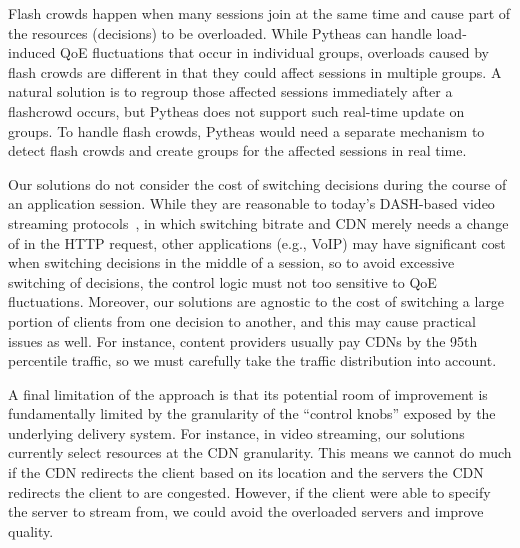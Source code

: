 Flash crowds happen when many sessions join at the same 
time and cause part of the resources (decisions) to be overloaded.
While Pytheas can handle load-induced QoE fluctuations that occur 
in individual groups, overloads caused by flash crowds are different in 
that they could affect sessions in multiple groups. A natural solution is 
to regroup those affected sessions immediately after a flashcrowd occurs, 
but Pytheas does not support such real-time update on groups. 
To handle flash crowds, Pytheas would need a separate mechanism to 
detect flash crowds and create groups for the affected sessions in 
real time.



Our solutions do not consider the cost of switching decisions during the course 
of an application session. 
While they are reasonable to today's DASH-based video streaming 
protocols~\cite{dash-standard}, in which switching bitrate and CDN merely needs
a change of in the HTTP request, other applications (e.g., VoIP) 
may have significant cost when switching decisions in the middle of a 
session, so to avoid excessive switching of decisions, the control logic must not 
too sensitive to QoE fluctuations.
Moreover, our solutions are agnostic to the cost of switching a large portion of clients 
from one decision to another, and this may cause practical issues as well.
For instance, content providers usually pay CDNs by the 95th percentile traffic, 
so we must carefully take the traffic distribution into account.


A final limitation of the \ddn approach is that its potential room of
improvement is fundamentally limited by the granularity of the 
``control knobs'' exposed by  the underlying delivery system. 
For instance, in video streaming, our solutions currently select resources
at the CDN granularity. This means we cannot
do much if the CDN redirects the client based on its location
and the servers the CDN redirects the client to are
congested. However, if the client were able to specify
the server to stream from, we could avoid the overloaded
servers and improve quality.


